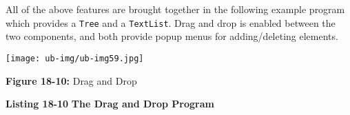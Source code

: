 All of the above features are brought together in the following example
program which provides a \texttt{Tree} and a \texttt{TextList}. Drag
and drop is enabled between the two components, and both provide popup
menus for adding/deleting elements.

\bigskip

\bigskip

\begin{center}
\texttt{[image: ub-img/ub-img59.jpg]}
\end{center}

{\sffamily\bfseries Figure 18-10:}
{\sffamily Drag and Drop}

\bigskip

{\sffamily\bfseries Listing 18-10}
{\sffamily\bfseries The Drag and Drop Program}

